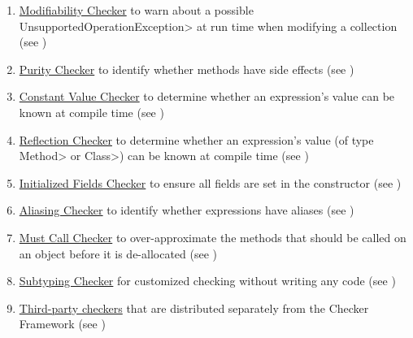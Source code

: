 \begin{enumerate}
  \hyperref[signedness-checker]{Signedness Checker} to
  ensure unsigned and signed values are not mixed
  (see )
\item
  \hyperref[modifiability-checker]{Modifiability Checker} to
  warn about a possible \<UnsupportedOperationException> at run time when
  modifying a collection
  (see )
\item
  \hyperref[purity-checker]{Purity Checker} to identify whether
  methods have side effects (see )
\item
  \hyperref[constant-value-checker]{Constant Value Checker} to determine
  whether an expression's value can be known at compile time
  (see )
\item
  \hyperref[reflection-resolution]{Reflection Checker} to determine
  whether an expression's value (of type \<Method> or \<Class>) can be known at compile time
  (see )
\item
  \hyperref[initialized-fields-checker]{Initialized Fields Checker} to ensure all
  fields are set in the constructor (see
  )

\item
  \hyperref[aliasing-checker]{Aliasing Checker} to identify whether
  expressions have aliases (see )
\item
  \hyperref[must-call-checker]{Must Call Checker} to over-approximate the
  methods that should be called on an object before it is de-allocated (see )
\item
  \hyperref[subtyping-checker]{Subtyping Checker} for customized checking without
  writing any code (see )
\item
  \hyperref[third-party-checkers]{Third-party checkers} that are distributed
  separately from the Checker Framework
  (see )

\end{enumerate}

